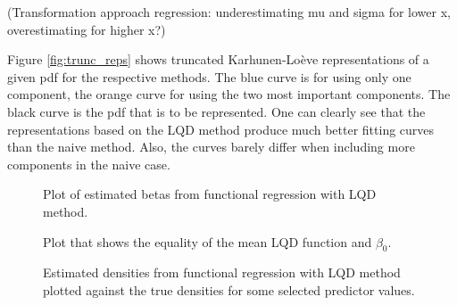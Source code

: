 (Transformation approach regression: underestimating mu and sigma for lower x,
overestimating for higher x?) \textcite{PetersenLiuDivani2021}

Figure \ref{fig:trunc_reps} shows truncated Karhunen-Loève representations of a given
pdf for the respective methods. The blue curve is for using only one component, the
orange curve for using the two most important components. The black curve is the pdf
that is to be represented. One can clearly see that the representations based on the LQD
method produce much better fitting curves than the naive method. Also, the curves barely
differ when including more components in the naive case.

\begin{figure}[h]
    \centering
    \resizebox{1\textwidth}{!}{}
    \caption[Estimated betas in LQD functional regression]{Plot of estimated betas from
    functional regression with LQD method.}
    \label{fig:betas}
\end{figure}

\begin{figure}[h]
    \centering
    \resizebox{1\textwidth}{!}{}
    \caption[Equality of mean LQD function and $\beta_0$]{Plot that shows the equality
    of the mean LQD function and $\beta_0$.}
    \label{fig:beta0vsmean}
\end{figure}

\begin{figure}[h]
    \centering
    \resizebox{1\textwidth}{!}{}
    \caption[Comparison: estimated vs. true densities --- LQD]{Estimated densities from
    functional regression with LQD method plotted against the true densities for some
    selected predictor values.}
    \label{fig:func_est_vs_true}
\end{figure}
